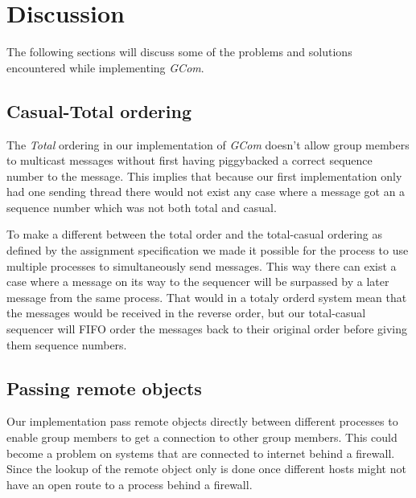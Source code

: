\documentclass[titlepage, twocolumn, a4paper, 10pt]{article}
\begin{document}
\section{Discussion}\label{sec:discussion}
The following sections will discuss some of the problems and solutions
encountered while implementing \textit{GCom}.

\subsection{Casual-Total ordering}\label{sec:disc-casual-total}
The \textit{Total} ordering in our implementation of \textit{GCom}
doesn't allow group members to multicast messages without first having
piggybacked a correct sequence number to the message. This implies
that because our first implementation only had one sending thread
there would not exist any case where a message got an a sequence
number which was not both total and casual.

To make a different between the total order and the total-casual
ordering as defined by the assignment specification we made it
possible for the process to use multiple processes to simultaneously
send messages. This way there can exist a case where a message on its
way to the sequencer will be surpassed by a later message from the
same process. That would in a totaly orderd system mean that the
messages would be received in the reverse order, but our total-casual
sequencer will FIFO order the messages back to their original order
before giving them sequence numbers.

\subsection{Passing remote objects}\label{sec:passing-remote-ojbects}
Our implementation pass remote objects directly between different
processes to enable group members to get a connection to other group
members. This could become a problem on systems that are connected to
internet behind a firewall. Since the lookup of the remote object only
is done once different hosts might not have an open route to a process
behind a firewall.
\end{document}
